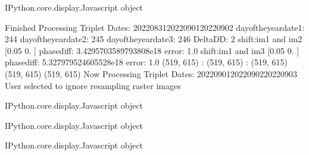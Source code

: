 \documentclass[letterpaper,10pt]{sphinxmanual}
\begin{document}
\begin{sphinxVerbatim}[commandchars=\\\{\}]
\PYGZlt{}IPython.core.display.Javascript object\PYGZgt{}
\end{sphinxVerbatim}



\begin{sphinxVerbatim}[commandchars=\\\{\}]
Finished Processing Triplet Dates:  20220831\PYGZhy{}20220901\PYGZhy{}20220902
day\PYGZus{}of\PYGZus{}the\PYGZus{}year\PYGZus{}date1:  244
\PYGZhy{}\PYGZhy{}\PYGZhy{}\PYGZhy{}\PYGZhy{}\PYGZhy{}\PYGZhy{}\PYGZhy{}\PYGZhy{}\PYGZhy{}\PYGZhy{}\PYGZhy{}\PYGZhy{}\PYGZhy{}\PYGZhy{}\PYGZhy{}\PYGZhy{}\PYGZhy{}\PYGZhy{}\PYGZhy{}\PYGZhy{}
day\PYGZus{}of\PYGZus{}the\PYGZus{}year\PYGZus{}date2:  245
\PYGZhy{}\PYGZhy{}\PYGZhy{}\PYGZhy{}\PYGZhy{}\PYGZhy{}\PYGZhy{}\PYGZhy{}\PYGZhy{}\PYGZhy{}\PYGZhy{}\PYGZhy{}\PYGZhy{}\PYGZhy{}\PYGZhy{}\PYGZhy{}\PYGZhy{}\PYGZhy{}\PYGZhy{}\PYGZhy{}\PYGZhy{}
day\PYGZus{}of\PYGZus{}the\PYGZus{}year\PYGZus{}date3:  246
\PYGZhy{}\PYGZhy{}\PYGZhy{}\PYGZhy{}\PYGZhy{}\PYGZhy{}\PYGZhy{}\PYGZhy{}\PYGZhy{}\PYGZhy{}\PYGZhy{}\PYGZhy{}\PYGZhy{}\PYGZhy{}\PYGZhy{}\PYGZhy{}\PYGZhy{}\PYGZhy{}\PYGZhy{}\PYGZhy{}\PYGZhy{}
Delta\PYGZus{}DD: 2
shift:im1 and im2 [\PYGZhy{}0.05  0.  ] phasediff: \PYGZhy{}3.4295703589793808e\PYGZhy{}18 error: 1.0
shift:im1 and im3 [\PYGZhy{}0.05  0.  ] phasediff: 5.327979524605528e\PYGZhy{}18 error: 1.0
(519, 615) :  (519, 615) :  (519, 615)
(519, 615)
(519, 615)
Now Processing Triplet Dates:  20220901\PYGZhy{}20220902\PYGZhy{}20220903
 User selected to ignore resampling raster images 



\PYGZlt{}IPython.core.display.Javascript object\PYGZgt{}
\end{sphinxVerbatim}



\begin{sphinxVerbatim}[commandchars=\\\{\}]
\PYGZlt{}IPython.core.display.Javascript object\PYGZgt{}
\end{sphinxVerbatim}



\begin{sphinxVerbatim}[commandchars=\\\{\}]
\PYGZlt{}IPython.core.display.Javascript object\PYGZgt{}
\end{sphinxVerbatim}
\end{document}
